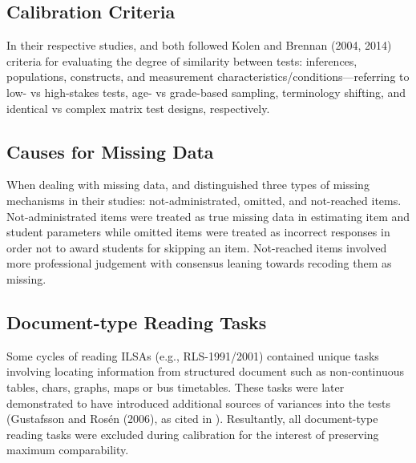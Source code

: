 \documentclass[
    a4paper,            %
    12pt,               %
    stu,                %
    donotrepeattitle,   %
    noextraspace,       %
    floatsintext,       %
    biblatex,           %
    colorlinks=true,        %
    linkcolor=red,          %
    anchorcolor=black,      %
    citecolor=blue,         %
    urlcolor=blue,          %
    bookmarks=true,         %
    bookmarksopen=false,    %
    bookmarksnumbered=true  %
]{apa7}
\begin{document}
\subsection{Calibration Criteria}

In their respective studies, \textcite{strietholt:2016} and \textcite{majoros:2021} both followed Kolen and Brennan (2004, 2014) criteria for evaluating the degree of similarity between tests: inferences, populations, constructs, and measurement characteristics/conditions---referring to low- vs high-stakes tests, age- vs grade-based sampling, terminology shifting, and identical vs complex matrix test designs, respectively.

\subsection{Causes for Missing Data}

When dealing with missing data, \textcite{majoros:2021} and \textcite{strietholt:2016} distinguished three types of missing mechanisms in their studies: not-administrated, omitted, and not-reached items. Not-administrated items were treated as true missing data in estimating item and student parameters while omitted items were treated as incorrect responses in order not to award students for skipping an item. Not-reached items involved more professional judgement with consensus leaning towards recoding them as missing.

\subsection{Document-type Reading Tasks}

Some cycles of reading ILSAs (e.g., RLS-1991/2001) contained unique tasks involving locating information from structured document such as non-continuous tables, chars, graphs, maps or bus timetables. These tasks were later demonstrated to have introduced additional sources of variances into the tests (Gustafsson and Ros{\'e}n (2006), as cited in \textcite{strietholt:2016}). Resultantly, all document-type reading tasks were excluded during calibration for the interest of preserving maximum comparability.


\end{document}
